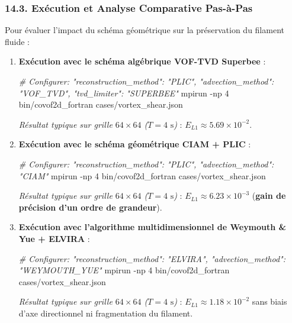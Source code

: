 \documentclass[
  french,
]{article}
\newenvironment{Shaded}{}{}
\newcommand{\AttributeTok}[1]{\textcolor[rgb]{0.49,0.56,0.16}{#1}}
\newcommand{\CommentTok}[1]{\textcolor[rgb]{0.38,0.63,0.69}{\textit{#1}}}
\newcommand{\ExtensionTok}[1]{#1}
\newcommand{\NormalTok}[1]{#1}
\begin{document}
\subsubsection{14.3. Exécution et Analyse Comparative
Pas-à-Pas}\label{exuxe9cution-et-analyse-comparative-pas-uxe0-pas}

Pour évaluer l'impact du schéma géométrique sur la préservation du
filament fluide :

\begin{enumerate}
\def\labelenumi{\arabic{enumi}.}
\item
  \textbf{Exécution avec le schéma algébrique VOF-TVD Superbee} :

\begin{Shaded}
\begin{Highlighting}[]
\CommentTok{\# Configurer: "reconstruction\_method": "PLIC", "advection\_method": "VOF\_TVD", "tvd\_limiter": "SUPERBEE"}
\ExtensionTok{mpirun} \AttributeTok{{-}np}\NormalTok{ 4 bin/covof2d\_fortran cases/vortex\_shear.json}
\end{Highlighting}
\end{Shaded}

  \emph{Résultat typique sur grille \(64 \times 64\) (\(T=4\text{ s}\))}
  : \(E_{L1} \approx 5.69 \times 10^{-2}\).
\item
  \textbf{Exécution avec le schéma géométrique CIAM + PLIC} :

\begin{Shaded}
\begin{Highlighting}[]
\CommentTok{\# Configurer: "reconstruction\_method": "PLIC", "advection\_method": "CIAM"}
\ExtensionTok{mpirun} \AttributeTok{{-}np}\NormalTok{ 4 bin/covof2d\_fortran cases/vortex\_shear.json}
\end{Highlighting}
\end{Shaded}

  \emph{Résultat typique sur grille \(64 \times 64\) (\(T=4\text{ s}\))}
  : \(E_{L1} \approx 6.23 \times 10^{-3}\) (\textbf{gain de précision
  d'un ordre de grandeur}).
\item
  \textbf{Exécution avec l'algorithme multidimensionnel de Weymouth \&
  Yue + ELVIRA} :

\begin{Shaded}
\begin{Highlighting}[]
\CommentTok{\# Configurer: "reconstruction\_method": "ELVIRA", "advection\_method": "WEYMOUTH\_YUE"}
\ExtensionTok{mpirun} \AttributeTok{{-}np}\NormalTok{ 4 bin/covof2d\_fortran cases/vortex\_shear.json}
\end{Highlighting}
\end{Shaded}

  \emph{Résultat typique sur grille \(64 \times 64\) (\(T=4\text{ s}\))}
  : \(E_{L1} \approx 1.18 \times 10^{-2}\) sans biais d'axe directionnel
  ni fragmentation du filament.
\end{enumerate}
\end{document}
